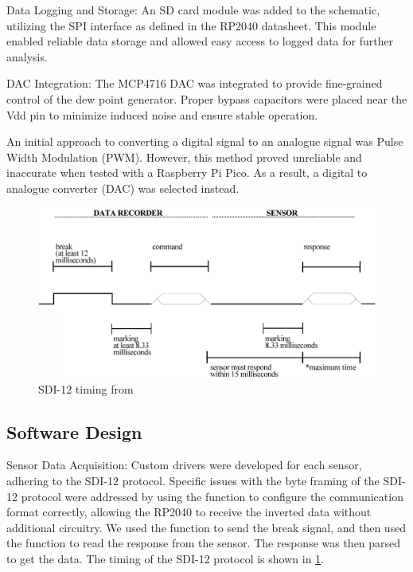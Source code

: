 Data Logging and Storage: An SD card module was added to the schematic, utilizing the SPI interface as defined in the RP2040 datasheet. This module enabled reliable data storage and allowed easy access to logged data for further analysis.

DAC Integration: The MCP4716 DAC was integrated to provide fine-grained control of the dew point generator. Proper bypass capacitors were placed near the Vdd pin to minimize induced noise and ensure stable operation.

An initial approach to converting a digital signal to an analogue signal was Pulse Width Modulation (PWM). 
However, this method proved unreliable and inaccurate when tested with a Raspberry Pi Pico. As a result, a digital to analogue converter (DAC) was selected instead.

\begin{figure}
    \includegraphics[width=\linewidth]{figures/SDI-12_timing.png}
    \caption{SDI-12 timing from \cite{sdi12_datasheet}}
    \label{sdi12_timing}
\end{figure}

\subsection{Software Design}
Sensor Data Acquisition: Custom drivers were developed for each sensor, adhering to the SDI-12 protocol. Specific issues with the byte framing of the SDI-12 protocol were addressed by using the  function to configure the communication format correctly, allowing the RP2040 to receive the inverted data without additional circuitry. We used the  function to send the break signal, and then used the  function to read the response from the sensor. The response was then parsed to get the data. The timing of the SDI-12 protocol is shown in \cref{sdi12_timing}.

